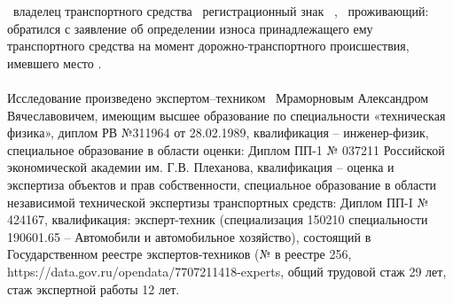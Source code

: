 

\vspace{2mm}
\noindent \dog\, владелец транспортного средства \, регистрационный знак  \,  , \, проживающий:  \, обратился с заявление об определении износа принадлежащего ему транспортного средства на момент дорожно-транспортного происшествия, имевшего место . %





\paragraph*{}
Исследование произведено  экспертом--техником
\,  Мраморновым Александром Вячеславовичем, имеющим высшее  образование по специальности «техническая физика», диплом РВ №311964 от 28.02.1989, квалификация -- инженер-физик, специальное образование в области оценки: Диплом ПП-1 № 037211 Российской экономической академии им. Г.В. Плеханова, квалификация -- оценка и экспертиза объектов и прав собственности, специальное образование в области независимой технической экспертизы транспортных средств: Диплом ПП-I № 424167, квалификация: эксперт-техник (специализация 150210 специальности 190601.65 – Автомобили и автомобильное хозяйство), состоящий в Государственном реестре экспертов-техников (№ в реестре 256, https://data.gov.ru/opendata/7707211418-experts,  общий трудовой  стаж 29 лет, стаж  экспертной работы  12 лет. 
\vspace{4mm}